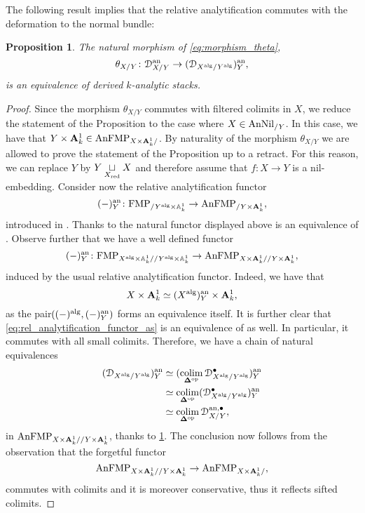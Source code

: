 \documentclass[10pt,a4paper,reqno]{amsart} %
\theoremstyle{plain}
\newtheorem{prop}[thm]{Proposition}
\theoremstyle{definition}
\theoremstyle{remark}
\numberwithin{equation}{section}
\begin{document}
The following result implies that the relative analytification commutes with the deformation to the normal bundle:

\begin{prop} \label{prop:rel_analytification_preserves_the_deformation}
    The natural morphism of \eqref{eq:morphism_theta},
        \[
            \theta_{X/ Y}\colon\mathcal D^\mathrm{an}_{X/Y}\to(\mathcal D_{X^\mathrm{alg}/ Y^\mathrm{alg}})^\mathrm{an}_Y,
        \]
    is an equivalence of derived $k$-analytic stacks.
\end{prop}

\begin{proof} Since the morphism $\theta_{X/ Y}$ commutes with filtered colimits in $X$, we reduce the statement of the Proposition to the
    case where $X \in \mathrm{AnNil}_{/ Y}$.
    In this case, we have that $Y \times \mathbf A^1_k \in \mathrm{AnFMP}_{X \times \mathbf A^1_k/ }$. By naturality of the morphism $\theta_{X/ Y}$
    we are allowed to prove the statement of the Proposition up to a retract. For this reason,
    we can replace $Y$ by $Y \underset{X_{\mathrm{red}}}{\sqcup} X$ and therefore assume that $f \colon X\to Y$ is a nil-embedding.
    Consider now the relative analytification functor
        \[
            (-)^\mathrm{an}_Y \colon \mathrm{FMP}_{/ Y^\mathrm{alg} \times \mathbb A^1_k}   \to \mathrm{AnFMP}_{/ Y \times \mathbf A^1_k}, 
        \]
    introduced in \cite[\S 6.1]{Porta_Yu_NQK}. Thanks to \cite[Theorem 6.12]{Porta_Yu_NQK} the natural functor displayed above is an equivalence of \infcats.
    Observe further that we have a well defined functor
        \begin{equation} \label{eq:rel_analytification_functor_as}
            (-)^\mathrm{an}_Y \colon \mathrm{FMP}_{X^\mathrm{alg} \times \mathbb A^1_k/ /Y^\mathrm{alg} \times \mathbb A^1_k} \to \mathrm{AnFMP}_{X \times \mathbf A^1_k/ /Y \times \mathbf A^1_k},
        \end{equation}
    induced by the usual relative analytification functor. Indeed, we have that 
        \[
            X \times \mathbf A^1_k \simeq (X^\mathrm{alg})^\mathrm{an}_Y \times \mathbf A^1_k,   
        \]
    as the pair$((-)^\mathrm{alg}, (-)^\mathrm{an}_Y)$ forms an equivalence itself. It is further clear that \eqref{eq:rel_analytification_functor_as}
    is an equivalence of \infcats as well. In particular, it commutes with all small colimits. Therefore, we have a chain of natural equivalences
        \begin{align*}
            (\mathcal D_{X^\mathrm{alg}/ Y^\mathrm{alg}})^\mathrm{an}_Y & \simeq (\operatorname*{colim}_{\bm{\Delta} ^\mathrm{op}} \mathcal D_{X^\mathrm{alg}/Y^\mathrm{alg}}^\bullet) ^\mathrm{an}_Y \\
                                      & \simeq \operatorname*{colim}_{\bm{\Delta} ^\mathrm{op}}(\mathcal D_{X^\mathrm{alg}/ Y^\mathrm{alg}}^\bullet)^\mathrm{an}_Y \\
                                      & \simeq \operatorname*{colim}_{\bm{\Delta} ^\mathrm{op}} \mathcal D_{X/ Y}^{\mathrm{an}, \bullet},
        \end{align*}
    in $\mathrm{AnFMP}_{X \times \mathbf A^1_k/ / Y\times \mathbf A^1_k}$, thanks to \cref{prop:rel_analytification_preserves_the_deformation}. The conclusion now follows from the observation that the forgetful functor
        \[
            \mathrm{AnFMP}_{X \times \mathbf A^1_k/ /Y \times \mathbf A^1_k} \to \mathrm{AnFMP}_{X \times \mathbf A^1_k/ }  ,
        \]
    commutes with colimits and it is moreover conservative, thus it reflects sifted colimits.
\end{proof}
\end{document}

